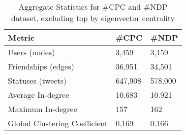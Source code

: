 \documentclass[a4paper,12pt]{article}
\begin{document}
\begin{table}[position specifier]
  \centering
  \begin{tabular}{| l | l | l |}
    \hline
    Metric & \#CPC & \#NDP \\ \hline
    Users (nodes) & 3,459 & 3,159 \\ \hline
    Friendships (edges) & 36,951 & 34,501 \\ \hline
    Statuses (tweets) & 647,908 & 578,000 \\ \hline
    Average In-degree & 10.683 & 10.921 \\ \hline
    Maximum In-degree & 157 & 162 \\ \hline
    Global Clustering Coefficient & 0.169 & 0.166 \\ \hline
    \hline
  \end{tabular}
  \caption{Aggregate Statistics for \#CPC and \#NDP dataset, excluding top by eigenvector centrality}
  \label{tab:aggregate_dataset_stats_exclude_eigenvector}
\end{table}
\end{document}

